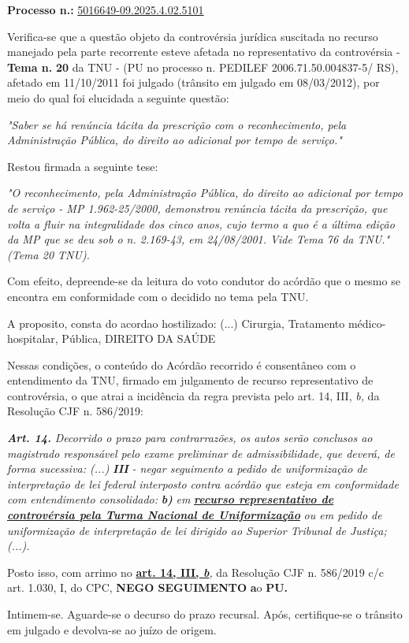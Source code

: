 \documentclass[12pt]{article}
\begin{document}
\justifying
\noindent \textbf{Processo n.: }\uline{5016649-09.2025.4.02.5101}

\noindent Verifica-se que a questão objeto da controvérsia jurídica suscitada no recurso manejado pela parte recorrente esteve afetada no representativo da controvérsia - \textbf{Tema n. }\textbf{20} da TNU - (PU no processo n. PEDILEF 2006.71.50.004837-5/ RS),  afetado em 11/10/2011 foi julgado (trânsito em julgado em 08/03/2012), por meio do qual foi elucidada a seguinte questão:

{\leftskip=3.1cm\rightskip=0.8cm\parindent=0pt \textit{"Saber se há renúncia tácita da prescrição com o reconhecimento, pela Administração Pública, do direito ao adicional por tempo de serviço."}\par}

\noindent Restou firmada a seguinte tese:

{\leftskip=3.1cm\rightskip=0.8cm\parindent=0pt \textit{"O reconhecimento, pela Administração Pública, do direito ao adicional por tempo de serviço - MP 1.962-25/2000, demonstrou renúncia tácita da prescrição, que volta a fluir na integralidade dos cinco anos, cujo termo a quo é a última edição da MP que se deu sob o n. 2.169-43, em 24/08/2001. Vide Tema 76 da TNU." (Tema 20 TNU).}\par}

\noindent Com efeito, depreende-se da leitura do voto condutor do acórdão que o mesmo se encontra em conformidade com o decidido no  tema pela TNU.

\noindent A proposito, consta do acordao hostilizado: (...) Cirurgia, Tratamento médico-hospitalar, Pública, DIREITO DA SAÚDE

\noindent Nessas condições, o conteúdo do Acórdão recorrido é consentâneo com o entendimento da TNU, firmado em julgamento de recurso representativo de controvérsia, o que atrai a incidência da regra prevista pelo art. 14, III, \textit{b,} da Resolução CJF n. 586/2019:

\noindent \textit{\textbf{Art. 14.}}\textit{ Decorrido o prazo para contrarrazões, os autos serão conclusos ao magistrado responsável pelo exame preliminar de admissibilidade, que deverá, de forma sucessiva: (...) }\textit{\textbf{III }}\textit{- negar seguimento a pedido de uniformização de interpretação de lei federal interposto contra acórdão que esteja em conformidade com entendimento consolidado: }\textit{\textbf{b)}}\textit{ em }\textit{\textbf{\uline{recurso representativo de controvérsia pela Turma Nacional de Uniformização}}}\textit{ ou em pedido de uniformização de interpretação de lei dirigido ao Superior Tribunal de Justiça;(...).}

\noindent Posto isso, com arrimo no \textbf{\uline{art. 14, III, }}\textit{\textbf{\uline{b}}}\textit{,} da Resolução CJF n. 586/2019 c/c art. 1.030, I, do CPC, \textbf{NEGO SEGUIMENTO }\textbf{a}o\textbf{ PU}\textbf{.}

\noindent Intimem-se. Aguarde-se o decurso do prazo recursal. Após, certifique-se o trânsito em julgado e devolva-se ao juízo de origem.
\end{document}
